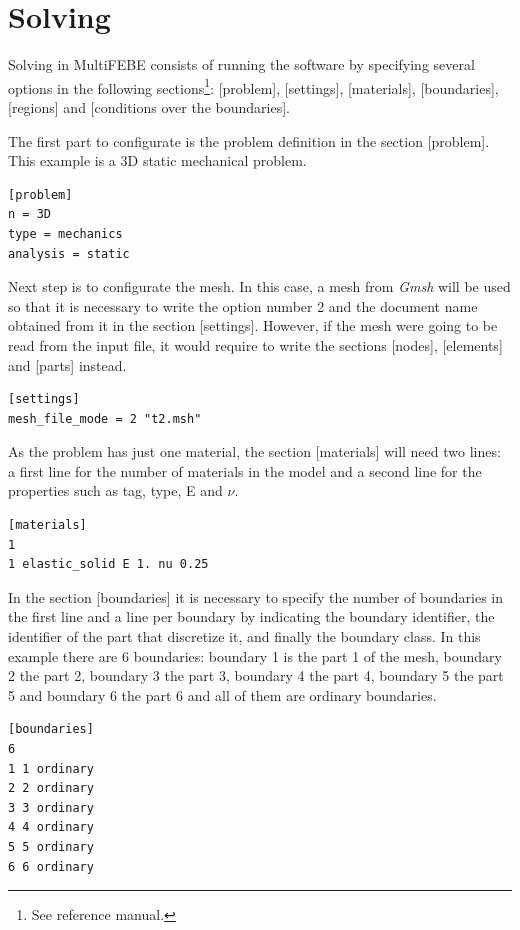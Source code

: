 \documentclass[a4]{article}
\begin{document}
\section{Solving}
Solving in MultiFEBE consists of running the software by specifying several options in the following sections\footnote{See reference manual.}: [problem], [settings], [materials], [boundaries], [regions] and [conditions over the boundaries].

The first part to configurate is the problem definition in the section [problem]. This example is a 3D static mechanical problem.  

\begin{Verbatim}	
[problem]
n = 3D
type = mechanics
analysis = static
\end{Verbatim}

Next step is to configurate the mesh. In this case, a mesh from \textit{Gmsh} will be used so that it is necessary to write the option number 2 and the document name obtained from it in the section [settings]. However, if the mesh were going to be read from the input file, it would require to write the sections [nodes], [elements] and [parts] instead.

\begin{Verbatim}	
[settings]
mesh_file_mode = 2 "t2.msh"
\end{Verbatim}

As the problem has just one material, the section [materials] will need two lines: a first line for the number of materials in the model and a second line for the properties such as tag, type, E and $\nu$.

\begin{Verbatim}	
[materials]
1
1 elastic_solid E 1. nu 0.25
\end{Verbatim}

In the section [boundaries] it is necessary to specify the number of boundaries in the first line and a line per boundary by indicating the boundary identifier,
the identifier of the part that discretize it, and finally the boundary class. In this example there are 6 boundaries: boundary 1 is the part 1 of the mesh, boundary 2 the part 2, boundary 3 the part 3, boundary 4 the part 4, boundary 5 the part 5 and boundary 6 the part 6 and all of them are ordinary boundaries.

\begin{Verbatim}	
[boundaries]
6
1 1 ordinary
2 2 ordinary
3 3 ordinary
4 4 ordinary
5 5 ordinary
6 6 ordinary
\end{Verbatim}
\end{document}
